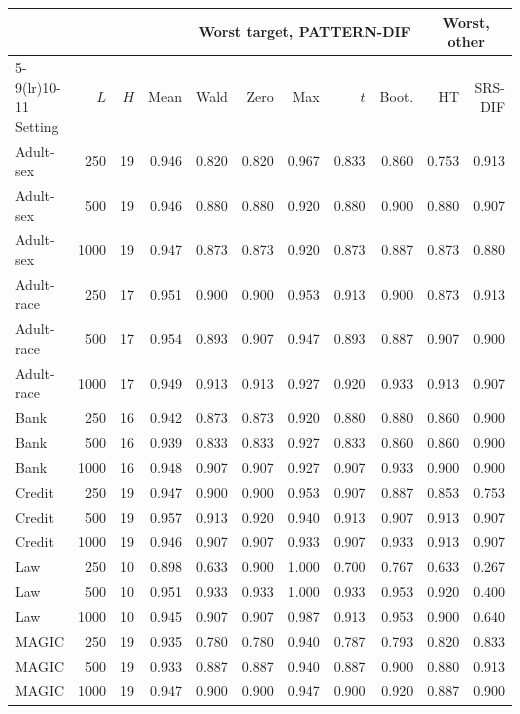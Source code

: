 \begin{tabular}{lrrrrrrrrrr}
\toprule
 & & & & \multicolumn{5}{c}{Worst target, PATTERN-DIF} & \multicolumn{2}{c}{Worst, other} \\
\cmidrule(lr){5-9}\cmidrule(lr){10-11}
Setting & $L$ & $H$ & Mean & Wald & Zero & Max & $t$ & Boot. & HT & SRS-DIF \\
\midrule
Adult-sex & 250 & 19 & 0.946 & 0.820 & 0.820 & 0.967 & 0.833 & 0.860 & 0.753 & 0.913 \\
Adult-sex & 500 & 19 & 0.946 & 0.880 & 0.880 & 0.920 & 0.880 & 0.900 & 0.880 & 0.907 \\
Adult-sex & 1000 & 19 & 0.947 & 0.873 & 0.873 & 0.920 & 0.873 & 0.887 & 0.873 & 0.880 \\
Adult-race & 250 & 17 & 0.951 & 0.900 & 0.900 & 0.953 & 0.913 & 0.900 & 0.873 & 0.913 \\
Adult-race & 500 & 17 & 0.954 & 0.893 & 0.907 & 0.947 & 0.893 & 0.887 & 0.907 & 0.900 \\
Adult-race & 1000 & 17 & 0.949 & 0.913 & 0.913 & 0.927 & 0.920 & 0.933 & 0.913 & 0.907 \\
Bank & 250 & 16 & 0.942 & 0.873 & 0.873 & 0.920 & 0.880 & 0.880 & 0.860 & 0.900 \\
Bank & 500 & 16 & 0.939 & 0.833 & 0.833 & 0.927 & 0.833 & 0.860 & 0.860 & 0.900 \\
Bank & 1000 & 16 & 0.948 & 0.907 & 0.907 & 0.927 & 0.907 & 0.933 & 0.900 & 0.900 \\
Credit & 250 & 19 & 0.947 & 0.900 & 0.900 & 0.953 & 0.907 & 0.887 & 0.853 & 0.753 \\
Credit & 500 & 19 & 0.957 & 0.913 & 0.920 & 0.940 & 0.913 & 0.907 & 0.913 & 0.907 \\
Credit & 1000 & 19 & 0.946 & 0.907 & 0.907 & 0.933 & 0.907 & 0.933 & 0.913 & 0.907 \\
Law & 250 & 10 & 0.898 & 0.633 & 0.900 & 1.000 & 0.700 & 0.767 & 0.633 & 0.267 \\
Law & 500 & 10 & 0.951 & 0.933 & 0.933 & 1.000 & 0.933 & 0.953 & 0.920 & 0.400 \\
Law & 1000 & 10 & 0.945 & 0.907 & 0.907 & 0.987 & 0.913 & 0.953 & 0.900 & 0.640 \\
MAGIC & 250 & 19 & 0.935 & 0.780 & 0.780 & 0.940 & 0.787 & 0.793 & 0.820 & 0.833 \\
MAGIC & 500 & 19 & 0.933 & 0.887 & 0.887 & 0.940 & 0.887 & 0.900 & 0.880 & 0.913 \\
MAGIC & 1000 & 19 & 0.947 & 0.900 & 0.900 & 0.947 & 0.900 & 0.920 & 0.887 & 0.900 \\

\end{tabular}

